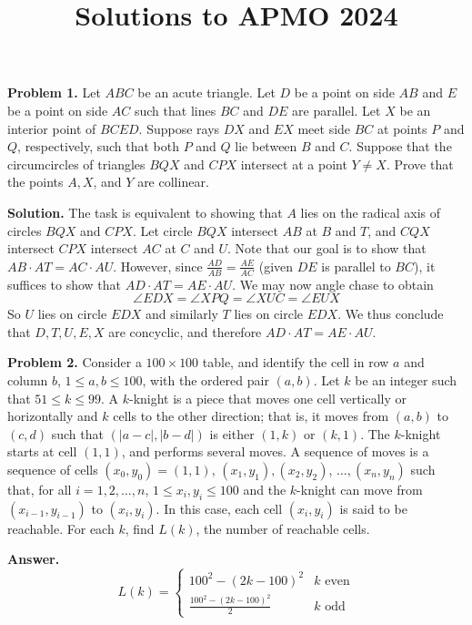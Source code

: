 \documentclass[11pt,a4paper]{article}
\title{Solutions to APMO 2024}
\date{}
\begin{document}
	\newcommand{\la}{\leftarrow}
	\newcommand{\lra}{\leftrightarrow}
	\newcommand{\bbN}{\mathbb{N}}
	\newcommand{\bbZ}{\mathbb{Z}}
	\newcommand{\dsum}{\displaystyle\sum}
	\newcommand{\dprod}{\displaystyle\prod}
	\maketitle
	
	\textbf{Problem 1.}
	Let $ABC$ be an acute triangle. Let $D$ be a point on side $AB$ and $E$ be a point on side $AC$ such that lines $BC$ and $DE$ are parallel. Let $X$ be an interior point of $BCED$. Suppose rays $DX$ and $EX$ meet side $BC$ at points $P$ and $Q$, respectively, such that both $P$ and $Q$ lie between $B$ and $C$. Suppose that the circumcircles of triangles $BQX$ and $CPX$ intersect at a point $Y \neq X$. Prove that the points $A, X$, and $Y$ are collinear.
	
	\textbf{Solution.}
	The task is equivalent to showing that $A$ lies on the radical axis of circles $BQX$ and $CPX$. 
	Let circle $BQX$ intersect $AB$ at $B$ and $T$, and $CQX$ intersect $CPX$ intersect $AC$ at $C$ and $U$. 
	Note that our goal is to show that $AB\cdot AT = AC\cdot AU$. 
	However, since $\frac{AD}{AB} = \frac{AE}{AC}$ (given $DE$ is parallel to $BC$), 
	it suffices to show that $AD\cdot AT = AE\cdot AU$. 
	We may now angle chase to obtain 
	\[
	\angle EDX = \angle XPQ = \angle XUC = \angle EUX
	\]
	So $U$ lies on circle $EDX$ and similarly $T$ lies on circle $EDX$. 
	We thus conclude that $D, T, U, E, X$ are concyclic, 
	and therefore $AD\cdot AT = AE\cdot AU$. 
	
	\textbf{Problem 2.} 
	Consider a $100 \times 100$ table, and identify the cell in row $a$ and column $b$, $1 \leq a, b \leq 100$, with the ordered pair $(a, b)$. Let $k$ be an integer such that $51 \leq k \leq 99$. A $k$-knight is a piece that moves one cell vertically or horizontally and $k$ cells to the other direction; that is, it moves from $(a, b)$ to $(c, d)$ such that $(|a-c|, |b - d|)$ is either $(1, k)$ or $(k, 1)$. The $k$-knight starts at cell $(1, 1)$, and performs several moves. A sequence of moves is a sequence of cells $(x_0, y_0)= (1, 1)$, $(x_1, y_1), (x_2, y_2)$, $\ldots, (x_n, y_n)$ such that, for all $i = 1, 2, \ldots, n$, $1 \leq x_i , y_i \leq 100$ and the $k$-knight can move from $(x_{i-1}, y_{i-1})$ to $(x_i, y_i)$. In this case, each cell $(x_i, y_i)$ is said to be reachable. For each $k$, find $L(k)$, the number of reachable cells.
	
	\textbf{Answer.} 
	\[
	L(k) = \begin{cases}
		100^2 - (2k-100)^2   & \text{$k$ even}\\
		\frac{100^2 - (2k-100)^2}{2}   & \text{$k$ odd}
	\end{cases}
	\]
	
\end{document}
